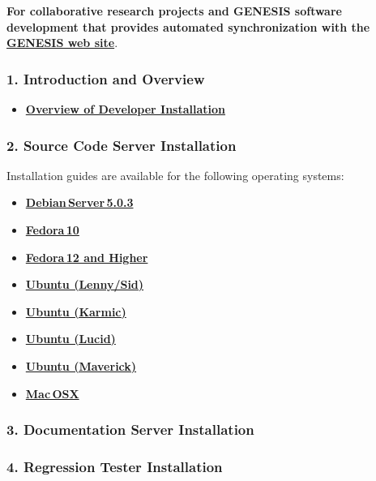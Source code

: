 \documentclass[12pt]{article}
\begin{document}
{\bf For collaborative research projects and GENESIS software development that provides automated synchronization with the \href{http://www.genesis-sim.org/}{\bf GENESIS web site}}.

\subsubsection*{1. Introduction and Overview}

\begin{itemize}
   \item[]\href{../developer-installation/developer-installation.tex}{\bf Overview of Developer Installation}
\end{itemize}

\subsubsection*{2. Source Code Server Installation}

Installation guides are available for the following operating systems:
\begin{itemize}
   \item[]\href{../installation-debian-server/installation-debian-server.tex}{\bf Debian\,Server\,5.0.3}
   \item[]\href{../installation-fedora10/installation-fedora10.tex}{\bf Fedora\,10}
   \item[]\href{../installation-fedora12/installation-fedora12.tex}{\bf Fedora\,12 and Higher}
   \item[]\href{../installation-ubuntu-lennysid/installation-ubuntu-lennysid.tex}{\bf Ubuntu (Lenny/Sid)}
   \item[]\href{../installation-ubuntu-karmic/installation-ubuntu-karmic.tex}{\bf Ubuntu (Karmic)}
   \item[]\href{../installation-ubuntu-lucid/installation-ubuntu-lucid.tex}{\bf Ubuntu (Lucid)}
   \item[]\href{../installation-ubuntu-maverick/installation-ubuntu-maverick.tex}{\bf Ubuntu (Maverick)}
   \item[]\href{../installation-osx/installation-osx.tex}{\bf Mac\,OSX}
\end{itemize}

\subsubsection*{3. Documentation Server Installation}

\subsubsection*{4. Regression Tester Installation}
\end{document}
